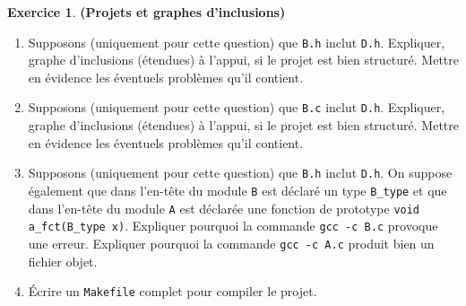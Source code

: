 \documentclass[12pt]{article}
\theoremstyle{definition}
\newtheorem{Exercice}{Exercice}
\begin{document}
\begin{Exercice} {\bf (Projets et graphes d'inclusions)}
\begin{enumerate}
        \item Supposons (uniquement pour cette question) que {\tt B.h}
        inclut {\tt D.h}. Expliquer, graphe d'inclusions (étendues) à
        l'appui, si le projet est bien structuré. Mettre en évidence les
        éventuels problèmes qu'il contient.
        \smallskip

        \item Supposons (uniquement pour cette question) que {\tt B.c}
        inclut {\tt D.h}. Expliquer, graphe d'inclusions (étendues) à
        l'appui, si le projet est bien structuré. Mettre en évidence les
        éventuels problèmes qu'il contient.
        \smallskip

        \item Supposons (uniquement pour cette question) que {\tt B.h}
        inclut {\tt D.h}. On suppose également que dans l'en-tête du
        module {\tt B} est déclaré un type {\tt B\_type} et que dans
        l'en-tête du module {\tt A} est déclarée une fonction de prototype
        {\tt void a\_fct(B\_type x)}. Expliquer pourquoi la commande
        {\tt gcc -c B.c} provoque une erreur. Expliquer pourquoi la
        commande {\tt gcc -c A.c} produit bien un fichier objet.
        \smallskip

        \item Écrire un {\tt Makefile} complet pour compiler le projet.
    \end{enumerate}
\end{Exercice}
\bigskip
\end{document}
